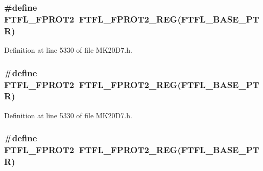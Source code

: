 \subsubsection[{\texorpdfstring{F\+T\+F\+L\+\_\+\+F\+P\+R\+O\+T2}{FTFL_FPROT2}}]{\setlength{\rightskip}{0pt plus 5cm}\#define F\+T\+F\+L\+\_\+\+F\+P\+R\+O\+T2~{\bf F\+T\+F\+L\+\_\+\+F\+P\+R\+O\+T2\+\_\+\+R\+EG}({\bf F\+T\+F\+L\+\_\+\+B\+A\+S\+E\+\_\+\+P\+TR})}\hypertarget{group___f_t_f_l___register___accessor___macros_gad1419b6c37f5984c3ef3a96d5f7d9ede}{}\label{group___f_t_f_l___register___accessor___macros_gad1419b6c37f5984c3ef3a96d5f7d9ede}


Definition at line 5330 of file M\+K20\+D7.\+h.

\subsubsection[{\texorpdfstring{F\+T\+F\+L\+\_\+\+F\+P\+R\+O\+T2}{FTFL_FPROT2}}]{\setlength{\rightskip}{0pt plus 5cm}\#define F\+T\+F\+L\+\_\+\+F\+P\+R\+O\+T2~{\bf F\+T\+F\+L\+\_\+\+F\+P\+R\+O\+T2\+\_\+\+R\+EG}({\bf F\+T\+F\+L\+\_\+\+B\+A\+S\+E\+\_\+\+P\+TR})}\hypertarget{group___f_t_f_l___register___accessor___macros_gad1419b6c37f5984c3ef3a96d5f7d9ede}{}\label{group___f_t_f_l___register___accessor___macros_gad1419b6c37f5984c3ef3a96d5f7d9ede}


Definition at line 5330 of file M\+K20\+D7.\+h.

\subsubsection[{\texorpdfstring{F\+T\+F\+L\+\_\+\+F\+P\+R\+O\+T2}{FTFL_FPROT2}}]{\setlength{\rightskip}{0pt plus 5cm}\#define F\+T\+F\+L\+\_\+\+F\+P\+R\+O\+T2~{\bf F\+T\+F\+L\+\_\+\+F\+P\+R\+O\+T2\+\_\+\+R\+EG}({\bf F\+T\+F\+L\+\_\+\+B\+A\+S\+E\+\_\+\+P\+TR})}\hypertarget{group___f_t_f_l___register___accessor___macros_gad1419b6c37f5984c3ef3a96d5f7d9ede}{}\label{group___f_t_f_l___register___accessor___macros_gad1419b6c37f5984c3ef3a96d5f7d9ede}


